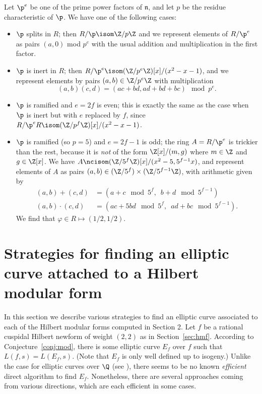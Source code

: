 \documentclass{amsart}
\newcommand{\n}{\mathfrak{n}}
\begin{document}
Let $\p^e$ be one of the prime power factors of $\n$, and let $p$ be the residue
characteristic of $\p$. We have one of the following cases:
\begin{itemize}
\item $\p$ splits in $R$; then $R/\p\isom \Z/p\Z$ and we represent elements
of $R/\p^e$ as pairs $(a,0)$ mod $p^e$ with the usual addition and multiplication
in the first factor.
\item $\p$ is inert in $R$; then $R/\p^e\isom (\Z/p^e\Z)[x]/(x^2-x-1)$,
and we represent elements by pairs $(a,b) \in \Z/p^e\Z$ with multiplication
$$(a,b)(c,d) = (ac+bd,ad+bd+bc) \mod p^e.$$
\item $\p$ is ramified and $e=2f$ is even; this is exactly the
same as the case when $\p$ is inert but with $e$ replaced by $f$,
since $R/\p^eR \isom (\Z/p^{f}\Z)[x]/(x^2-x-1)$.
\item $\p$ is ramified (so $p=5$) and $e=2f-1$ is odd; the ring $A=R/\p^e$
  is trickier than the rest, because it is {\em not} of the form
  $\Z[x]/(m,g)$ where $m\in\Z$ and $g \in\Z[x]$.  We have $A \ncisom
  (\Z/5^f\Z)[x]/(x^2-5, 5^{f-1}x)$, and represent elements of $A$ as
  pairs $(a,b) \in (\Z/5^f)\times (\Z/5^{f-1}\Z)$, with arithmetic
  given by
\begin{align*}
(a,b) + (c,d) &= (a+c \mod 5^f,\,\,\, b+d \mod 5^{f-1})\\
(a,b)\cdot (c,d) &= (ac+5bd \mod 5^f,\,\,\, ad+bc \mod 5^{f-1}).
\end{align*}
 We find that $ \varphi \in R \mapsto (1/2,1/2)$.
\end{itemize}



\section{Strategies for finding an elliptic curve attached to a Hilbert modular form}\label{sec:finding}
In this section we describe various strategies to find an elliptic curve
 associated to each of the Hilbert modular forms computed in Section 2.
Let $f$ be a rational cuspidal Hilbert newform of weight $(2,2)$ as
in Section~\ref{sec:hmf}.  According to Conjecture~\ref{conj:mod},
there is some elliptic curve $E_f$ over $f$ such that $L(f,s) =
L(E_f,s)$.  (Note that $E_f$ is only well defined up to isogeny.)
Unlike the case for elliptic curves over $\Q$ (see \cite{cremona:algs}), 
there seems to be no known {\em efficient} direct algorithm to find $E_f$.
 Nonetheless, there are several approaches coming from various directions, 
which are each efficient in some cases.
\end{document}
